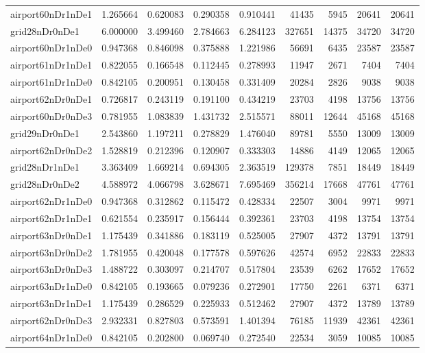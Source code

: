 \begin{longtable}{|l|r|r|r|r|r|r|r|r|}
airport60nDr1nDe1 & 1.265664 & 0.620083 & 0.290358 & 0.910441 & 41435 & 5945 & 20641 & 20641 \\
grid28nDr0nDe1 & 6.000000 & 3.499460 & 2.784663 & 6.284123 & 327651 & 14375 & 34720 & 34720 \\
airport60nDr1nDe0 & 0.947368 & 0.846098 & 0.375888 & 1.221986 & 56691 & 6435 & 23587 & 23587 \\
airport61nDr1nDe1 & 0.822055 & 0.166548 & 0.112445 & 0.278993 & 11947 & 2671 & 7404 & 7404 \\
airport61nDr1nDe0 & 0.842105 & 0.200951 & 0.130458 & 0.331409 & 20284 & 2826 & 9038 & 9038 \\
airport62nDr0nDe1 & 0.726817 & 0.243119 & 0.191100 & 0.434219 & 23703 & 4198 & 13756 & 13756 \\
airport60nDr0nDe3 & 0.781955 & 1.083839 & 1.431732 & 2.515571 & 88011 & 12644 & 45168 & 45168 \\
grid29nDr0nDe1 & 2.543860 & 1.197211 & 0.278829 & 1.476040 & 89781 & 5550 & 13009 & 13009 \\
airport62nDr0nDe2 & 1.528819 & 0.212396 & 0.120907 & 0.333303 & 14886 & 4149 & 12065 & 12065 \\
grid28nDr1nDe1 & 3.363409 & 1.669214 & 0.694305 & 2.363519 & 129378 & 7851 & 18449 & 18449 \\
grid28nDr0nDe2 & 4.588972 & 4.066798 & 3.628671 & 7.695469 & 356214 & 17668 & 47761 & 47761 \\
airport62nDr1nDe0 & 0.947368 & 0.312862 & 0.115472 & 0.428334 & 22507 & 3004 & 9971 & 9971 \\
airport62nDr1nDe1 & 0.621554 & 0.235917 & 0.156444 & 0.392361 & 23703 & 4198 & 13754 & 13754 \\
airport63nDr0nDe1 & 1.175439 & 0.341886 & 0.183119 & 0.525005 & 27907 & 4372 & 13791 & 13791 \\
airport63nDr0nDe2 & 1.781955 & 0.420048 & 0.177578 & 0.597626 & 42574 & 6952 & 22833 & 22833 \\
airport63nDr0nDe3 & 1.488722 & 0.303097 & 0.214707 & 0.517804 & 23539 & 6262 & 17652 & 17652 \\
airport63nDr1nDe0 & 0.842105 & 0.193665 & 0.079236 & 0.272901 & 17750 & 2261 & 6371 & 6371 \\
airport63nDr1nDe1 & 1.175439 & 0.286529 & 0.225933 & 0.512462 & 27907 & 4372 & 13789 & 13789 \\
airport62nDr0nDe3 & 2.932331 & 0.827803 & 0.573591 & 1.401394 & 76185 & 11939 & 42361 & 42361 \\
airport64nDr1nDe0 & 0.842105 & 0.202800 & 0.069740 & 0.272540 & 22534 & 3059 & 10085 & 10085 \\

\end{longtable}
